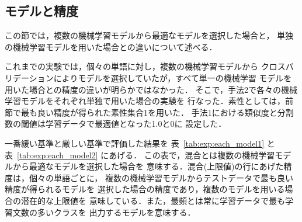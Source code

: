 \subsection{モデルと精度}
\label{sec:models_and_accuracy}

この節では，複数の機械学習モデルから最適なモデルを選択した場合と，
単独の機械学習モデルを用いた場合との違いについて述べる．

これまでの実験では，個々の単語に対し，複数の機械学習モデルから
クロスバリデーションによりモデルを選択していたが，すべて単一の機械学習
モデルを用いた場合との精度の違いが明らかではなかった．
そこで，手法2で各々の機械学習モデルをそれぞれ単独で用いた場合の実験を
行なった．素性としては，前節で最も良い精度が得られた素性集合1を用いた．
手法1における類似度と分割数の閾値は学習データで最適値となった1.0と0に
設定した．

一番緩い基準と厳しい基準で評価した結果を
表~\ref{tab:exp:each_model1} と表~\ref{tab:exp:each_model2} にあげる．
この表で，混合とは複数の機械学習モデルから最適なモデルを選択した場合を
意味する．混合(上限値)の行にあげた精度は，個々の単語ごとに，
複数の機械学習モデルからテストデータで最も良い精度が得られるモデルを
選択した場合の精度であり，複数のモデルを用いる場合の潜在的な上限値を
意味している．また，最頻とは常に学習データで最も学習文数の多いクラスを
出力するモデルを意味する．

